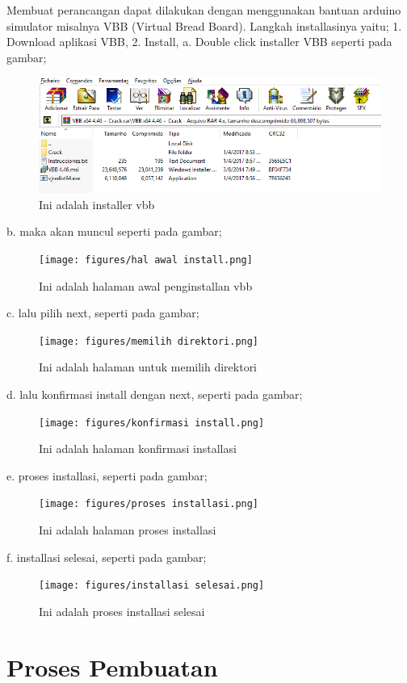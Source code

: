 Membuat perancangan dapat dilakukan dengan menggunakan bantuan arduino simulator misalnya VBB (Virtual Bread Board). Langkah installasinya yaitu;
1. Download aplikasi VBB,
2. Install,
    a. Double click installer VBB seperti pada gambar;
\begin{figure}[ht]
  \centerline{\includegraphics[width=.75\textwidth]{figures/installer.png}}
  \caption{Ini adalah installer vbb}
  \label{fig:installer}
  \end{figure}
    b. maka akan muncul seperti pada gambar;
\begin{figure}[ht]
  \centerline{\texttt{[image: figures/hal awal install.png]}}
  \caption{Ini adalah halaman awal penginstallan vbb}
  \label{fig:hal awal install}
  \end{figure}
    c. lalu pilih next, seperti pada gambar;
\begin{figure}[ht]
  \centerline{\texttt{[image: figures/memilih direktori.png]}}
  \caption{Ini adalah halaman untuk memilih direktori}
  \label{fig:memilih direktori}
  \end{figure}
    d. lalu konfirmasi install dengan next, seperti pada gambar;
\begin{figure}[ht]
  \centerline{\texttt{[image: figures/konfirmasi install.png]}}
  \caption{Ini adalah halaman konfirmasi installasi}
  \label{fig:konfirmasi install}
  \end{figure}
    e. proses installasi, seperti pada gambar;
\begin{figure}[ht]
  \centerline{\texttt{[image: figures/proses installasi.png]}}
  \caption{Ini adalah halaman proses installasi}
  \label{fig:proses installasi}
  \end{figure}
    f. installasi selesai, seperti pada gambar;
\begin{figure}[ht]
  \centerline{\texttt{[image: figures/installasi selesai.png]}}
  \caption{Ini adalah proses installasi selesai}
  \label{fig:installasi selesai}
  \end{figure}
\section{Proses Pembuatan}

